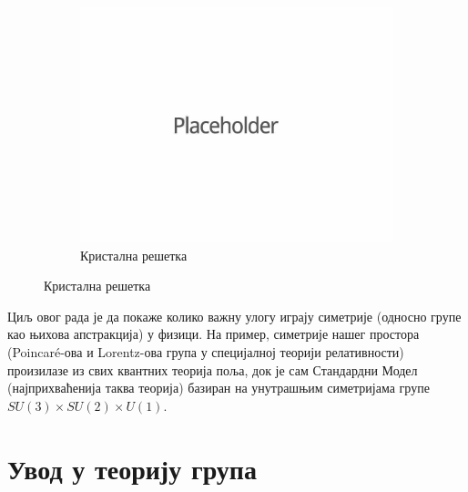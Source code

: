 \documentclass{report}
\theoremstyle{plain}
\theoremstyle{definition}
\begin{document}
\begin{figure}[h]
\begin{subfigure}{0.3\textwidth}
\includegraphics[width=\textwidth]{placeholder}
\caption{Кристална решетка}
\end{subfigure}
\end{figure}

Циљ овог рада је да покаже колико важну улогу играју симетрије (односно групе као њихова апстракција) у физици. На пример, симетрије нашег простора (Poincaré-ова и Lorentz-ова група у специјалној теорији релативности) произилазе из свих квантних теорија поља, док је сам Стандардни Модел (најприхваћенија таква теорија) базиран на унутрашњим симетријама групе $SU(3)\times SU(2)\times U(1)$.

\chapter{Увод у теорију група}
\end{document}
